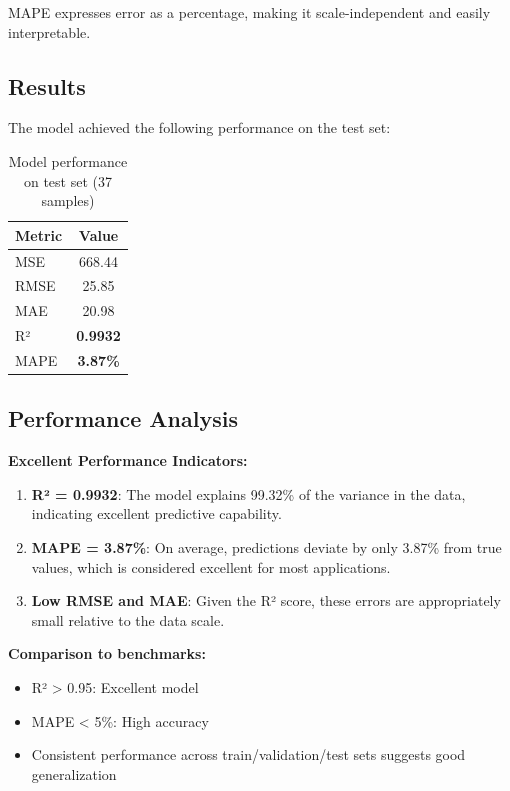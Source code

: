 \documentclass[12pt,a4paper]{article}
\begin{document}
MAPE expresses error as a percentage, making it scale-independent and easily interpretable.

\subsection{Results}

The model achieved the following performance on the test set:

\begin{table}[H]
\centering
\begin{tabular}{@{}lc@{}}
\toprule
\textbf{Metric} & \textbf{Value} \\ \midrule
MSE & 668.44 \\
RMSE & 25.85 \\
MAE & 20.98 \\
R² & \textbf{0.9932} \\
MAPE & \textbf{3.87\%} \\ \bottomrule
\end{tabular}
\caption{Model performance on test set (37 samples)}
\label{tab:results}
\end{table}

\subsection{Performance Analysis}

\textbf{Excellent Performance Indicators:}

\begin{enumerate}
    \item \textbf{R² = 0.9932}: The model explains 99.32\% of the variance in the data, indicating excellent predictive capability.

    \item \textbf{MAPE = 3.87\%}: On average, predictions deviate by only 3.87\% from true values, which is considered excellent for most applications.

    \item \textbf{Low RMSE and MAE}: Given the R² score, these errors are appropriately small relative to the data scale.
\end{enumerate}

\textbf{Comparison to benchmarks:}
\begin{itemize}
    \item R² > 0.95: Excellent model
    \item MAPE < 5\%: High accuracy
    \item Consistent performance across train/validation/test sets suggests good generalization
\end{itemize}
\end{document}
